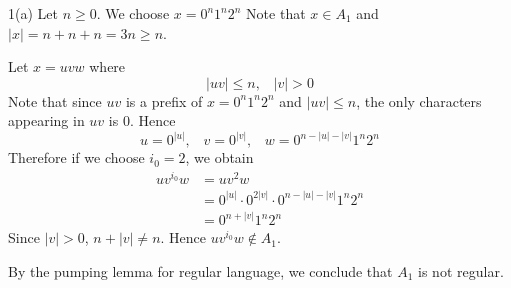
1(a)
Let $n \geq 0$.
We choose $x = 0^n 1^n 2^n$
Note that $x \in A_1$ and $|x| = n + n + n = 3n \geq n$.

Let $x = uvw$ where
\[
|uv| \leq n, \,\,\,\,\, |v| > 0
\]
Note that since $uv$ is a prefix of $x = 0^n 1^n 2^n$ and $|uv| \leq n$,
the only characters appearing in $uv$ is $0$.
Hence
\[
u = 0^{|u|}, \,\,\,\,\,
v = 0^{|v|}, \,\,\,\,\,
w = 0^{n - |u| - |v|} 1^n 2^n
\]
Therefore if we choose $i_0 = 2$, we obtain
\begin{align*}
u v^{i_0} w 
&= u v^2 w \\
&= 0^{|u|} \cdot 0^{2|v|} \cdot 0^{n - |u| - |v|} 1^n 2^n \\
&= 0^{n + |v|} 1^n 2^n
\end{align*}
Since $|v| > 0$, $n + |v| \neq n$.
Hence $u v^{i_0} w \not\in A_1$.

By the pumping lemma for regular language,
we conclude that $A_1$ is not regular.
